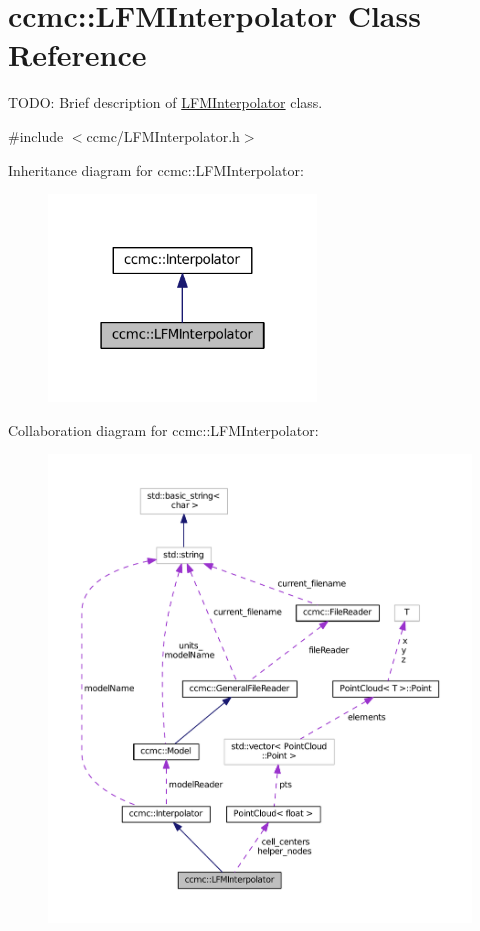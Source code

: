 \hypertarget{classccmc_1_1_l_f_m_interpolator}{\section{ccmc\-:\-:L\-F\-M\-Interpolator Class Reference}
\label{classccmc_1_1_l_f_m_interpolator}
}


T\-O\-D\-O\-: Brief description of \hyperlink{classccmc_1_1_l_f_m_interpolator}{L\-F\-M\-Interpolator} class.  




{\ttfamily \#include $<$ccmc/\-L\-F\-M\-Interpolator.\-h$>$}



Inheritance diagram for ccmc\-:\-:L\-F\-M\-Interpolator\-:
\nopagebreak
\begin{figure}[H]
\begin{center}
\leavevmode
\includegraphics[width=202pt]{classccmc_1_1_l_f_m_interpolator__inherit__graph}
\end{center}
\end{figure}


Collaboration diagram for ccmc\-:\-:L\-F\-M\-Interpolator\-:
\nopagebreak
\begin{figure}[H]
\begin{center}
\leavevmode
\includegraphics[width=350pt]{classccmc_1_1_l_f_m_interpolator__coll__graph}
\end{center}
\end{figure}
